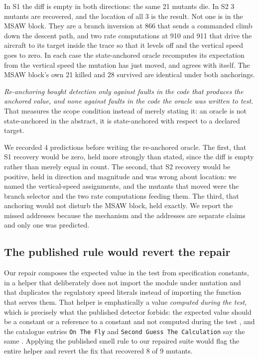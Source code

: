 \documentclass[12pt]{article}
\begin{document}
In S1 the diff is empty in both directions: the same 21 mutants die. In S2 3
mutants are recovered, and the location of all 3 is
the result. Not one is in the MSAW block. They are a branch inversion at 866 that
sends a commanded climb down the descent path, and two rate computations at 910
and 911 that drive the aircraft to its target inside the trace so that it levels
off and the vertical speed goes to zero. In each case the state-anchored oracle
recomputes its expectation from the vertical speed the mutation has just moved,
and agrees with itself. The MSAW block's own 21 killed and 28 survived are
identical under both anchorings.

\emph{Re-anchoring bought detection only against faults in the code that produces
the anchored value, and none against faults in the code the oracle was written to
test.} That measures the scope condition instead of merely stating it: an oracle
is not state-anchored in the abstract, it is state-anchored with respect to a
declared target.

We recorded 4 predictions before writing the re-anchored oracle. The first, that
S1 recovery would be zero, held more strongly than stated, since the diff is empty
rather than merely equal in count. The second, that S2 recovery would be positive,
held in direction and magnitude and was wrong about location: we named the
vertical-speed assignments, and the mutants that moved were the branch selector and
the two rate computations feeding them. The third, that anchoring would not disturb
the MSAW block, held exactly. We report the missed addresses because the mechanism
and the addresses are separate claims and only one was predicted.

\subsection{The published rule would revert the repair}

Our repair composes the expected value in the test from specification constants,
in a helper that deliberately does not import the module under mutation and that duplicates the regulatory speed literals instead of importing the function that serves them. That helper is emphatically a value \emph{computed during the test},
which is precisely what the published detector forbids: the expected value should
be a constant or a reference to a constant and not computed during the test
\cite{rwemalika2021}, and the catalogue entries \texttt{On The Fly} and
\texttt{Second Guess The Calculation} say the same \cite{soares2023catalog}.
Applying the published smell rule to our repaired suite would flag the entire
helper and revert the fix that recovered 8 of 9 mutants.
\end{document}

